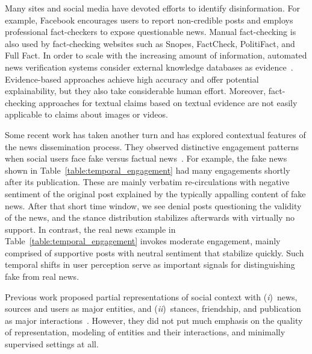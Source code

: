 \documentclass[sigconf]{acmart}
\theoremstyle{definition}
\theoremstyle{hypothesis}
\begin{document}
Many sites and social media have devoted efforts to identify disinformation. For example, Facebook encourages users to report non-credible posts
and employs professional fact-checkers to expose questionable news. Manual fact-checking is also used by fact-checking websites such as Snopes,
FactCheck,
PolitiFact,
and Full Fact.
In order to scale with the increasing amount of information, automated news verification systems consider external knowledge databases as evidence~\cite{hassan2017claimbuster,thorne2018factcheck,popat2018credeye}. Evidence-based approaches achieve high accuracy and offer potential explainability, but they also take considerable human effort.
Moreover, fact-checking approaches for textual claims based on textual evidence are not easily applicable to claims about images or videos.

Some recent work has taken another turn and has explored contextual features of the news dissemination process. 
They observed distinctive engagement patterns when social users face fake versus factual news~\cite{ma2016detecting,jin2016news}.
For example, the fake news shown in Table~\ref{table:temporal_engagement} had many engagements shortly after its publication. These are mainly verbatim
re-circulations with negative sentiment of the original post explained by the typically appalling content of fake news. After that short time window, we see denial 
posts questioning the validity of the news, and the stance distribution stabilizes afterwards with virtually no support. In contrast, the real news example in Table~\ref{table:temporal_engagement} invokes moderate engagement, mainly comprised of supportive posts with neutral sentiment that stabilize quickly. Such temporal shifts in user perception serve as important signals for distinguishing fake from real news. 

Previous work proposed partial representations of social context with (\emph{i})~news, sources and users as major entities, and (\emph{ii})~stances, friendship, and publication as major interactions~\cite{jin2014news,popat2017truth,shu2019beyond,popat2016credibility}. However, they did not put much emphasis on the quality of representation, modeling of entities and their interactions, and minimally supervised settings at all.  
\end{document}
